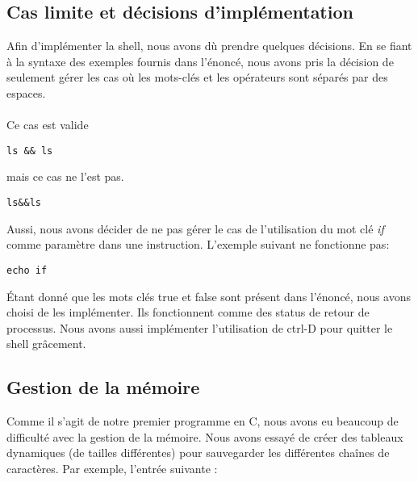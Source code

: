 \documentclass{article}
\begin{document}
\subsection{Cas limite et décisions d'implémentation}
Afin d'implémenter la shell, nous avons dù prendre quelques décisions. En se fiant à la syntaxe des exemples fournis dans l'énoncé, nous avons pris la décision de seulement gérer les cas où les mots-clés et les opérateurs sont séparés par des espaces.
\\\\
Ce cas est valide
\begin{verbatim}
ls && ls
\end{verbatim}
mais ce cas ne l'est pas.
\begin{verbatim}
ls&&ls
\end{verbatim}
Aussi, nous avons décider de ne pas gérer le cas de l'utilisation du mot clé \emph{if} comme paramètre dans une instruction. L'exemple suivant ne fonctionne pas:
\begin{verbatim}
echo if
\end{verbatim}
Étant donné que les mots clés true et false sont présent dans l'énoncé, nous avons choisi de les implémenter. Ils fonctionnent comme des status de retour de processus.
Nous avons aussi implémenter l'utilisation de ctrl-D pour quitter le shell grâcement.

\subsection{Gestion de la mémoire}

Comme il s’agit de notre premier programme en C, nous avons eu beaucoup de difficulté avec la gestion de la mémoire. Nous avons essayé de créer des tableaux dynamiques (de tailles différentes) pour sauvegarder les différentes chaînes de caractères. Par exemple, l’entrée suivante :
\end{document}
